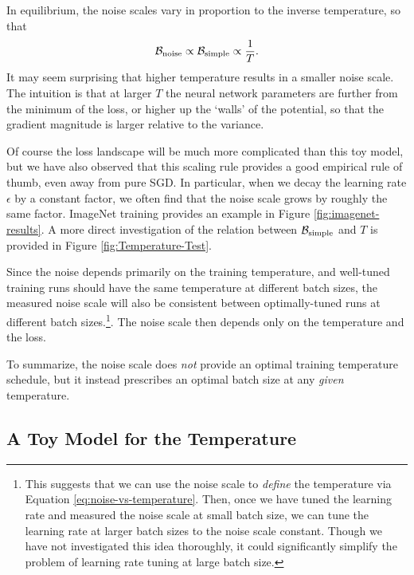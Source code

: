 \documentclass[english]{article}
\newcommand{\be}{\begin{eqnarray}}
\newcommand{\ee}{\end{eqnarray}}
\newcommand{\CB}{{\cal B}}
\begin{document}
In equilibrium, the noise scales  vary in proportion to the inverse temperature, so that
\be
\CB_{\rm noise} \propto \CB_{\rm simple} \propto \frac{1}{T}.\label{eq:noise-vs-temperature}
\ee
It may seem surprising that higher temperature results in a smaller noise scale.  The intuition is that at larger $T$ the neural network parameters are further from the minimum of the loss, or higher up the `walls' of the potential, so that the gradient magnitude is larger relative to the variance.

Of course the loss landscape will be much more complicated than this toy model, but we have also observed that this scaling rule provides a good empirical rule of thumb, even away from pure SGD.  In particular, when we decay the learning rate $\epsilon$ by a constant factor, we often find that the noise scale grows by roughly the same factor.  ImageNet training provides an example in Figure \ref{fig:imagenet-results}.  A more direct investigation of the relation between $\CB_{\rm simple}$ and $T$ is provided in Figure \ref{fig:Temperature-Test}.

Since the noise depends primarily on the training temperature, and well-tuned training runs should have the same temperature at different batch sizes, the measured noise scale will also be consistent between optimally-tuned runs at different batch sizes.\footnote{This suggests that we can use the noise scale to \emph{define} the temperature via Equation \ref{eq:noise-vs-temperature}.  Then, once we have tuned the learning rate and measured the noise scale at small batch size, we can tune the learning rate at larger batch sizes to the noise scale constant.  Though we have not investigated this idea thoroughly, it could significantly simplify the problem of learning rate tuning at large batch size.}.  The noise scale then depends only on the temperature and the loss.

To summarize, the noise scale does \emph{not} provide an optimal training temperature schedule, but it instead prescribes an optimal batch size at any \emph{given} temperature.

\subsection*{A Toy Model for the Temperature}
\end{document}
